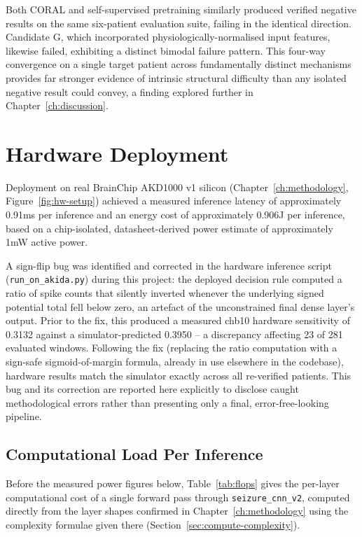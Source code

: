Both CORAL and self-supervised pretraining similarly produced verified negative results on the same six-patient evaluation suite, failing in the identical direction. Candidate G, which incorporated physiologically-normalised input features, likewise failed, exhibiting a distinct bimodal failure pattern. This four-way convergence on a single target patient across fundamentally distinct mechanisms provides far stronger evidence of intrinsic structural difficulty than any isolated negative result could convey, a finding explored further in Chapter~\ref{ch:discussion}.

\section{Hardware Deployment}
\label{sec:results-hw}

Deployment on real BrainChip AKD1000 v1 silicon (Chapter~\ref{ch:methodology}, Figure~\ref{fig:hw-setup}) achieved a measured inference latency of approximately 0.91ms per inference and 
an energy cost of approximately 0.906\textmu J per inference, based on a chip-isolated, datasheet-derived power estimate of approximately 1mW active power.

A sign-flip bug was identified and corrected in the hardware inference script (\texttt{run\_on\_akida.py}) during this project: the deployed decision rule computed a ratio of spike 
counts that silently inverted whenever the underlying signed potential total fell below zero, an artefact of the unconstrained final dense layer's output. Prior to the fix, this 
produced a measured chb10 hardware sensitivity of 0.3132 against a simulator-predicted 0.3950 -- a discrepancy affecting 23 of 281 evaluated windows. Following the fix (replacing the 
ratio computation with a sign-safe sigmoid-of-margin formula, already in use elsewhere in the codebase), hardware results match the simulator exactly across all re-verified patients. 
This bug and its correction are reported here explicitly to disclose caught methodological errors rather than presenting only a final, error-free-looking pipeline.

\subsection{Computational Load Per Inference}

Before the measured power figures below, Table~\ref{tab:flops} gives the per-layer computational cost of a single forward pass through \texttt{seizure\_cnn\_v2}, computed directly from the layer shapes confirmed in Chapter~\ref{ch:methodology} using the complexity formulae given there (Section~\ref{sec:compute-complexity}).


